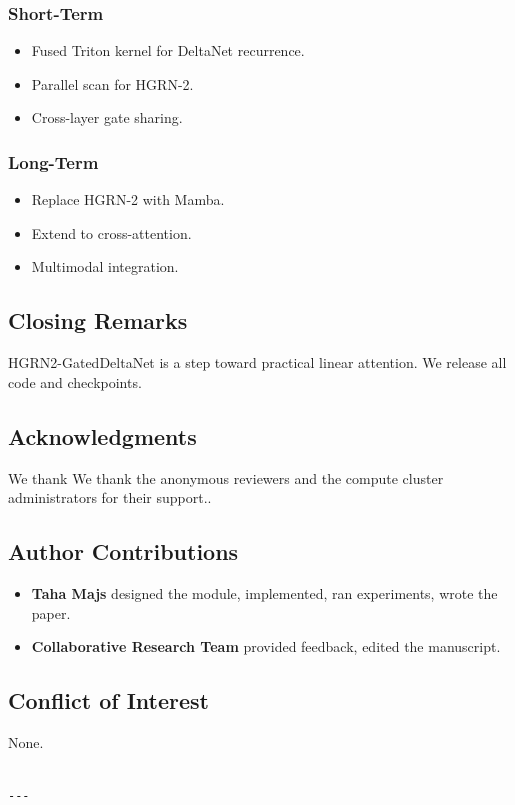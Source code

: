 \subsubsection{Short-Term}
\begin{itemize}
\item Fused Triton kernel for DeltaNet recurrence.
\item Parallel scan for HGRN-2.
\item Cross-layer gate sharing.

\end{itemize}
\subsubsection{Long-Term}
\begin{itemize}
\item Replace HGRN-2 with Mamba.
\item Extend to cross-attention.
\item Multimodal integration.

\end{itemize}
\subsection{Closing Remarks}

HGRN2-GatedDeltaNet is a step toward practical linear attention. We 
release all code and checkpoints.

\subsection{Acknowledgments}

We thank We thank the anonymous reviewers and the compute cluster administrators for their support..

\subsection{Author Contributions}

\begin{itemize}
\item \textbf{Taha Majs} designed the module, implemented, ran experiments, wrote
  the paper.
\item \textbf{Collaborative Research Team} provided feedback, edited the manuscript.

\end{itemize}
\subsection{Conflict of Interest}

None.
\begin{lstlisting}

---
\end{lstlisting}